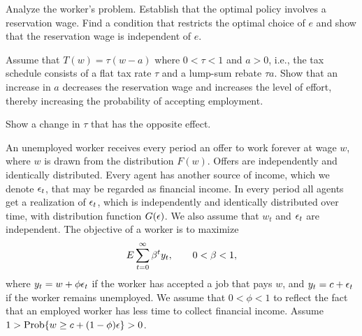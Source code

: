 \medskip{}  Analyze the worker's problem. Establish that the optimal policy 
involves  a reservation wage. Find a condition  that restricts  the
optimal choice of $e$ and show that the reservation wage is independent of $%
e$.

\medskip{} Assume that $T\left( w\right) =\tau \left( w-a\right) $ where $%
0<\tau <1$ and $a>0$, i.e., the tax schedule consists of a flat tax rate $%
\tau $ and a lump-sum rebate $\tau a$. Show that an increase in $a$
decreases the reservation wage and increases the level of effort, thereby increasing
the probability of accepting employment.

\medskip{} Show   a change in $\tau $ that  has the opposite
effect.




\medskip
{} 
\medskip
\noindent An unemployed worker receives every period an offer to work forever at wage
$w$, where $w$ is drawn from the distribution $F(w)$.  Offers are independently
and identically distributed.  Every agent has another source of income, which
we denote ${\epsilon}_t$, that may be regarded as financial income.  In every
period all agents get a realization of ${\epsilon}_t$, which is independently and
identically distributed over time, with distribution function $G({\epsilon})$.  We
also assume that $w_t$ and ${\epsilon}_t$ are independent.  The objective of a worker
is to maximize
$$E\sum_{t=0}^\infty {\beta}^t y_t,\qquad 0<{\beta} <1,$$
where $y_t=w+\phi{\epsilon}_t$ if the worker has accepted a job that pays $w$, and
$y_t=c+{\epsilon}_t$ if the worker remains unemployed.  We assume that $0<\phi<1$ to
reflect the fact that an employed worker has less time to collect financial income.  Assume $1>{\rm Prob}\{w\ge c+(1-\phi){\epsilon}\}
>0$.

